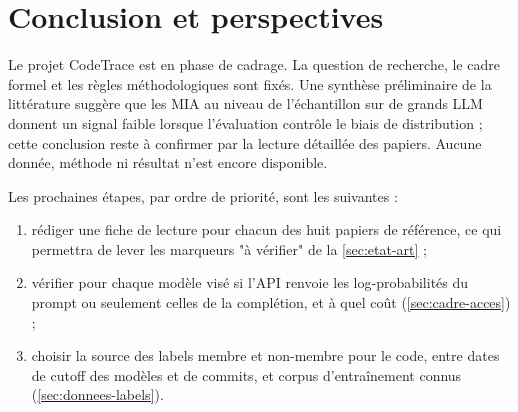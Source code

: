 \section{Conclusion et perspectives}\label{sec:conclusion}
	Le projet CodeTrace est en phase de cadrage. La question de recherche, le cadre formel et les règles méthodologiques sont fixés. Une synthèse préliminaire de la littérature suggère que les MIA au niveau de l'échantillon sur de grands LLM donnent un signal faible lorsque l'évaluation contrôle le biais de distribution ; cette conclusion reste à confirmer par la lecture détaillée des papiers. Aucune donnée, méthode ni résultat n'est encore disponible.

	Les prochaines étapes, par ordre de priorité, sont les suivantes :
	\begin{enumerate}
		\item rédiger une fiche de lecture pour chacun des huit papiers de référence, ce qui permettra de lever les marqueurs "à vérifier" de la \cref{sec:etat-art} ;
		\item vérifier pour chaque modèle visé si l'API renvoie les log-probabilités du prompt ou seulement celles de la complétion, et à quel coût (\cref{sec:cadre-acces}) ;
		\item choisir la source des labels membre et non-membre pour le code, entre dates de cutoff des modèles et de commits, et corpus d'entraînement connus (\cref{sec:donnees-labels}).
	\end{enumerate}
